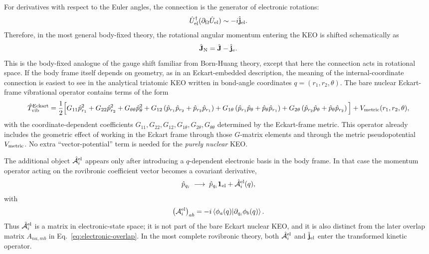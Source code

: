 \documentclass[11pt]{revtex4-2}
\begin{document}
For derivatives with respect to the Euler angles, the connection is the
generator of electronic rotations:
\begin{equation}
  \hat{U}_{\rm el}^\dagger
  (\partial_\Omega \hat{U}_{\rm el})
  \sim
  -i \hat{\mathbf{j}}_{\rm el}.
\end{equation}
Therefore, in the most general body-fixed theory, the rotational angular
momentum entering the KEO is shifted schematically as
\begin{equation}
  \hat{\mathbf{J}}_{\rm N} 
= 
  \hat{\mathbf{J}} - \hat{\mathbf{j}}_{\rm e}.
  \label{eq:j-shift}
\end{equation}
This is the body-fixed analogue of the gauge shift familiar from
Born-Huang theory, except that here the connection acts in rotational
space.  If the body frame itself depends on geometry, as in an
Eckart-embedded description, the meaning of the internal-coordinate
connection is easiest to see in the analytical triatomic KEO written in
bond-angle coordinates $q=(r_1,r_2,\theta)$.  The bare nuclear Eckart-frame
vibrational operator contains terms of the form
\begin{equation}
  \hat{T}_{\rm vib}^{\rm Eckart}
  =
  \frac{1}{2}
  \Big[
    G_{11}\hat{p}_{r_1}^2
    +
    G_{22}\hat{p}_{r_2}^2
    +
    G_{\theta\theta}\hat{p}_{\theta}^2
    +
    G_{12}\left(
      \hat{p}_{r_1}\hat{p}_{r_2}
      +
      \hat{p}_{r_2}\hat{p}_{r_1}
    \right)
    +
    G_{1\theta}\left(
      \hat{p}_{r_1}\hat{p}_{\theta}
      +
      \hat{p}_{\theta}\hat{p}_{r_1}
    \right)
    +
    G_{2\theta}\left(
      \hat{p}_{r_2}\hat{p}_{\theta}
      +
      \hat{p}_{\theta}\hat{p}_{r_2}
    \right)
  \Big]
  +
  V_{\rm metric}(r_1,r_2,\theta),
\end{equation}
with the coordinate-dependent coefficients
$G_{11},G_{22},G_{12},G_{1\theta},G_{2\theta},G_{\theta\theta}$ determined
by the Eckart-frame metric.  This operator already includes the geometric
effect of working in the Eckart frame through those $G$-matrix elements and
through the metric pseudopotential $V_{\rm metric}$.  No extra
``vector-potential'' term is needed for the \emph{purely nuclear} KEO.

The additional object
$\hat{\mathcal A}_i^{\rm el}$ appears only after introducing a
$q$-dependent electronic basis in the body frame.  In that case the
momentum operator acting on the rovibronic coefficient vector becomes a
covariant derivative,
\begin{equation}
  \hat{p}_{q_i}
  \;\longrightarrow\;
  \hat{p}_{q_i}\mathbf{1}_{\rm el}
  +
  \hat{\mathcal A}_i^{\rm el}(q),
\end{equation}
with
\begin{equation}
  \left(
    \mathcal A_i^{\rm el}
  \right)_{ab}
  =
  -i
  \braket{\phi_a(q)}{\partial_{q_i}\phi_b(q)} .
\end{equation}
Thus $\hat{\mathcal A}_i^{\rm el}$ is a matrix in electronic-state space;
it is not part of the bare Eckart nuclear KEO, and it is also distinct from
the later overlap matrix $A_{na,mb}$ in Eq.~\eqref{eq:electronic-overlap}.
In the most complete rovibronic theory, both
$\hat{\mathcal A}_i^{\rm el}$ and $\hat{\mathbf j}_{\rm el}$ enter the
transformed kinetic operator.
\end{document}
